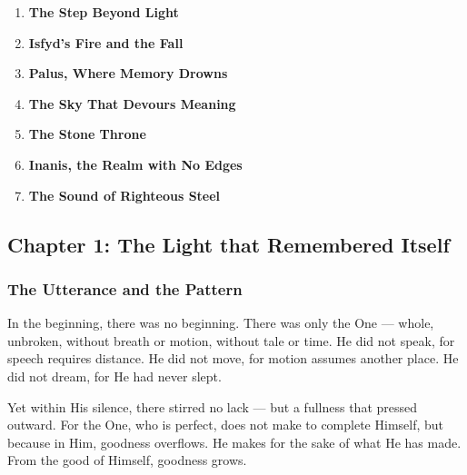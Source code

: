 \documentclass[12pt]{article}
\begin{document}
\begin{enumerate}
    \item \textbf{The Step Beyond Light} 

    \vspace{1em}
    \item \textbf{Isfyd's Fire and the Fall} 

    \vspace{1em}
    \item \textbf{Palus, Where Memory Drowns} 

    \vspace{1em}
    \item \textbf{The Sky That Devours Meaning} 

    \vspace{1em}
    \item \textbf{The Stone Throne} 

    \vspace{1em}
    \item \textbf{Inanis, the Realm with No Edges}

    \vspace{1em}
    \item \textbf{The Sound of Righteous Steel} 

\end{enumerate}

\newpage

\subsection{Chapter 1: The Light that Remembered Itself}

\vspace{.5in}

\subsubsection{The Utterance and the Pattern}


In the beginning, there was no beginning.  
There was only the One --- whole, unbroken, without breath or motion, without tale or time.  
He did not speak, for speech requires distance.  
He did not move, for motion assumes another place.  
He did not dream, for He had never slept.

Yet within His silence, there stirred no lack —  
but a fullness that pressed outward.  
For the One, who is perfect, does not make to complete Himself,  
but because in Him, goodness overflows.  
He makes for the sake of what He has made.  
From the good of Himself, goodness grows.
\end{document}
